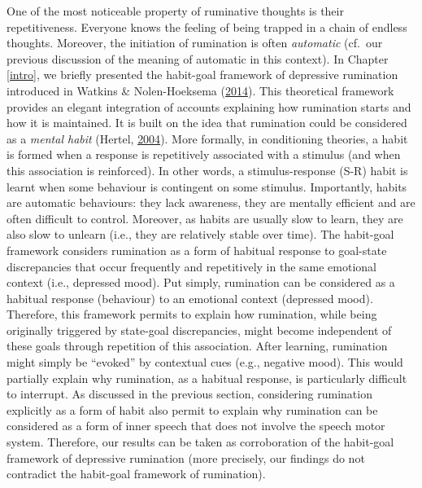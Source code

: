 \documentclass[a4paper,12pt,twoside,openright,oldfontcommands,final]{memoir}
\begin{document}
One of the most noticeable property of ruminative thoughts is their repetitiveness. Everyone knows the feeling of being trapped in a chain of endless thoughts. Moreover, the initiation of rumination is often \emph{automatic} (cf.~our previous discussion of the meaning of automatic in this context). In Chapter \ref{intro}, we briefly presented the habit-goal framework of depressive rumination introduced in Watkins \& Nolen-Hoeksema (\protect\hyperlink{ref-watkins_habit-goal_2014}{2014}). This theoretical framework provides an elegant integration of accounts explaining how rumination starts and how it is maintained. It is built on the idea that rumination could be considered as a \emph{mental habit} (Hertel, \protect\hyperlink{ref-hertel_memory_2004}{2004}). More formally, in conditioning theories, a habit is formed when a response is repetitively associated with a stimulus (and when this association is reinforced). In other words, a stimulus-response (S-R) habit is learnt when some behaviour is contingent on some stimulus. Importantly, habits are automatic behaviours: they lack awareness, they are mentally efficient and are often difficult to control. Moreover, as habits are usually slow to learn, they are also slow to unlearn (i.e., they are relatively stable over time). The habit-goal framework considers rumination as a form of habitual response to goal-state discrepancies that occur frequently and repetitively in the same emotional context (i.e., depressed mood). Put simply, rumination can be considered as a habitual response (behaviour) to an emotional context (depressed mood). Therefore, this framework permits to explain how rumination, while being originally triggered by state-goal discrepancies, might become independent of these goals through repetition of this association. After learning, rumination might simply be \enquote{evoked} by contextual cues (e.g., negative mood). This would partially explain why rumination, as a habitual response, is particularly difficult to interrupt. As discussed in the previous section, considering rumination explicitly as a form of habit also permit to explain why rumination can be considered as a form of inner speech that does not involve the speech motor system. Therefore, our results can be taken as corroboration of the habit-goal framework of depressive rumination (more precisely, our findings do not contradict the habit-goal framework of rumination).
\end{document}
